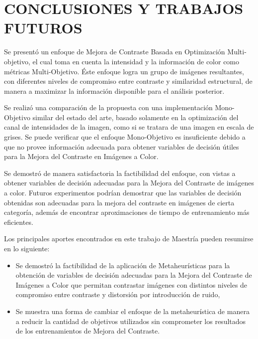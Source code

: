 \chapter{CONCLUSIONES Y TRABAJOS\\ FUTUROS}
\label{sec:conclusion}

Se presentó un enfoque de Mejora de Contraste Basada en Optimización Multi-objetivo, el cual toma en cuenta la intensidad y la información de color como métricas Multi-Objetivo. Éste enfoque logra un grupo de imágenes resultantes, con diferentes niveles de compromiso entre contraste y similaridad estructural, de manera a maximizar la información disponible para el análisis posterior.

Se realizó una comparación de la propuesta con una implementación Mono-Objetivo similar del estado del arte, basado solamente en la optimización del canal de intensidades de la imagen, como si se tratara de una imagen en escala de grises. Se puede verificar que el enfoque Mono-Objetivo es insuficiente debido a que no provee información adecuada para obtener variables de decisión útiles para la Mejora del Contraste en Imágenes a Color.

Se demostró de manera satisfactoria la factibilidad del enfoque, con vistas a obtener variables de decisión adecuadas para la Mejora del Contraste de imágenes a color. Futuros experimentos podrían demostrar que las variables de decisión obtenidas son adecuadas para la mejora del contraste en imágenes de cierta categoría, además de encontrar aproximaciones de tiempo de entrenamiento más eficientes.

Los principales aportes encontrados en este trabajo de Maestría pueden resumirse en lo siguiente:

\begin{itemize}
	\item Se demostró la factibilidad de la aplicación de Metaheurísticas para la obtención de variables de decisión adecuadas para la Mejora del Contraste de Imágenes a Color que permitan contrastar imágenes con distintos niveles de compromiso entre contraste y distorsión por introducción de ruido,

	\item Se muestra una forma de cambiar el enfoque de la metaheurística de manera a reducir la cantidad de objetivos utilizados sin comprometer los resultados de los entrenamientos de Mejora del Contraste.
\end{itemize}


